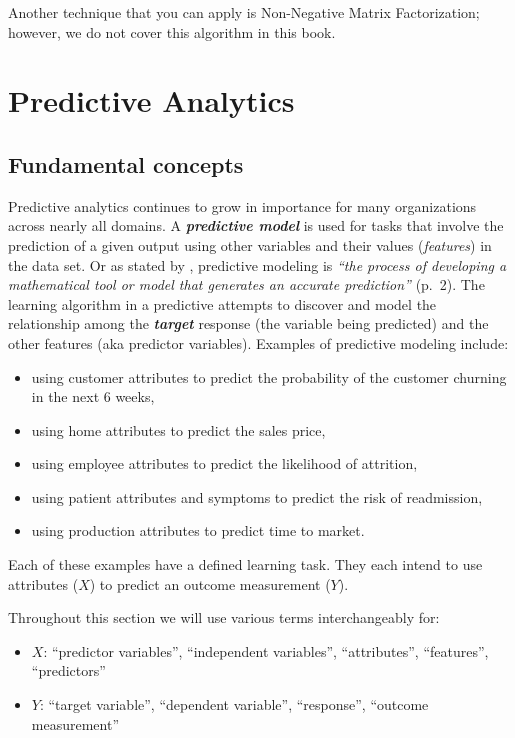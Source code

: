 \documentclass[]{book}
\providecommand{\tightlist}{%
  \setlength{\itemsep}{0pt}\setlength{\parskip}{0pt}}
\theoremstyle{definition}
\theoremstyle{definition}
\theoremstyle{definition}
\theoremstyle{remark}
\let\BeginKnitrBlock\begin \let\EndKnitrBlock\end
\begin{document}
\BeginKnitrBlock{tip}
Another technique that you can apply is Non-Negative Matrix
Factorization; however, we do not cover this algorithm in this book.
\EndKnitrBlock{tip}

\hypertarget{part-predictive-analytics}{%
\part{Predictive Analytics}\label{part-predictive-analytics}}

\hypertarget{fundamentalconcepts}{%
\chapter{Fundamental concepts}\label{fundamentalconcepts}}

Predictive analytics continues to grow in importance for many
organizations across nearly all domains. A \textbf{\emph{predictive
model}} is used for tasks that involve the prediction of a given output
using other variables and their values (\emph{features}) in the data
set. Or as stated by \citet{apm}, predictive modeling is \emph{``the
process of developing a mathematical tool or model that generates an
accurate prediction''} (p.~2). The learning algorithm in a predictive
attempts to discover and model the relationship among the
\textbf{\emph{target}} response (the variable being predicted) and the
other features (aka predictor variables). Examples of predictive
modeling include:

\begin{itemize}
\tightlist
\item
  using customer attributes to predict the probability of the customer
  churning in the next 6 weeks,
\item
  using home attributes to predict the sales price,
\item
  using employee attributes to predict the likelihood of attrition,
\item
  using patient attributes and symptoms to predict the risk of
  readmission,
\item
  using production attributes to predict time to market.
\end{itemize}

Each of these examples have a defined learning task. They each intend to
use attributes (\(X\)) to predict an outcome measurement (\(Y\)).

\begin{note}
Throughout this section we will use various terms interchangeably for:

\begin{itemize}
\tightlist
\item
  \(X\): ``predictor variables'', ``independent variables'',
  ``attributes'', ``features'', ``predictors''
\item
  \(Y\): ``target variable'', ``dependent variable'', ``response'',
  ``outcome measurement''
\end{itemize}
\end{note}
\end{document}
